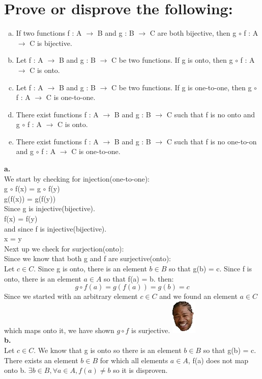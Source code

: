 \section{Prove or disprove the following:}
\begin{enumerate}[a.]
\item If two functions f : A $\rightarrow$ B and g : B $\rightarrow$ C are both bijective, then g $\circ$ f : A $\rightarrow$ C is bijective.
\item Let f : A $\rightarrow$ B and g : B $\rightarrow$ C be two functions. If g is onto, then g $\circ$ f : A $\rightarrow$ C is onto.
\item Let f : A $\rightarrow$ B and g : B $\rightarrow$ C be two functions. If g is one-to-one, then g $\circ$ f : A $\rightarrow$ C is one-to-one.
\item There exist functions f : A $\rightarrow$ B and g : B $\rightarrow$ C such that f is no onto and g $\circ$ f : A $\rightarrow$ C is onto.
\item There exist functions f : A $\rightarrow$ B and g : B $\rightarrow$ C such that f is no one-to-on and g $\circ$ f : A $\rightarrow$ C is one-to-one.
\end{enumerate}
\textbf{a.}\\
We start by checking for injection(one-to-one):\\
g $\circ$ f(x) = g $\circ$ f(y)\\
g(f(x)) = g(f(y))\\
Since g is injective(bijective).\\
f(x) = f(y)\\
and since f is injective(bijective).\\
x = y\\
Next up we check for surjection(onto):\\
Since we know that both g and f are surjective(onto):\\
Let $c \in C$. Since g is onto, there is an element $b \in B$ so that g(b) = c. Since f is onto, there is an element $a \in A$ so that f(a) = b. then:\\
\begin{equation}
g \circ f(a) = g(f(a)) = g(b) = c
\end{equation}
Since we started with an arbitrary element $c \in C$ and we found an element $a \in C$ which maps onto it, we have shown $g \circ f$ is surjective. \includegraphics[scale=0.70]{billeder/xzibit}\\
\textbf{b.}\\
Let $c \in C$. We know that g is onto so there is an element $b \in B$ so that g(b) = c. There exists an element $b \in B$ for which all elements $a \in A$, f(a) does not map onto b. $\exists b \in B, \forall	a \in A, f(a) \neq b$ so it is disproven.

